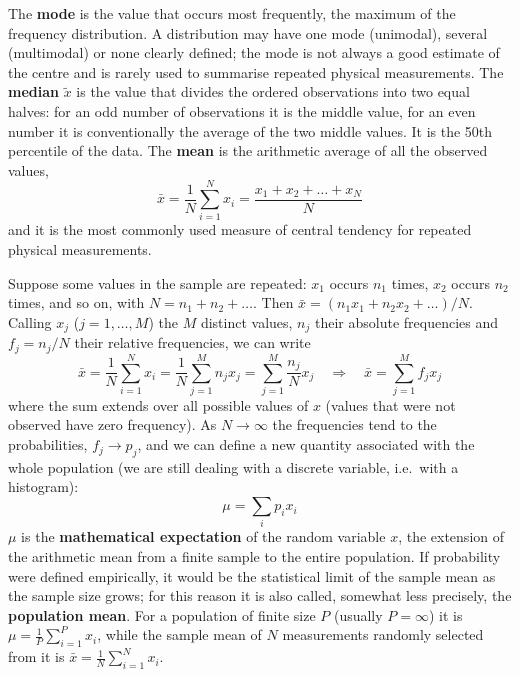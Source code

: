 \documentclass[letterpaper,11pt,leqno]{book}
\begin{document}
The \textbf{mode} is the value that occurs most frequently, the maximum of the frequency distribution. A distribution may have one mode (unimodal), several (multimodal) or none clearly defined; the mode is not always a good estimate of the centre and is rarely used to summarise repeated physical measurements. The \textbf{median} $\tilde{x}$ is the value that divides the ordered observations into two equal halves: for an odd number of observations it is the middle value, for an even number it is conventionally the average of the two middle values. It is the 50th percentile of the data. The \textbf{mean} is the arithmetic average of all the observed values,
\begin{equation}
\boxed{\bar{x} = \frac{1}{N}\sum_{i=1}^{N}x_i = \frac{x_1 + x_2 + \dots + x_N}{N}}
\label{eq:arithmetic_mean}
\end{equation}
and it is the most commonly used measure of central tendency for repeated physical measurements.

Suppose some values in the sample are repeated: $x_1$ occurs $n_1$ times, $x_2$ occurs $n_2$ times, and so on, with $N = n_1 + n_2 + \dots$. Then $\bar{x} = (n_1x_1 + n_2x_2 + \dots)/N$. Calling $x_j$ ($j = 1, \dots, M$) the $M$ distinct values, $n_j$ their absolute frequencies and $f_j = n_j/N$ their relative frequencies, we can write
\begin{equation}
\bar{x} = \frac{1}{N}\sum_{i=1}^{N}x_i = \frac{1}{N}\sum_{j=1}^{M}n_jx_j = \sum_{j=1}^{M}\frac{n_j}{N}x_j \quad \Longrightarrow \quad \boxed{\bar{x} = \sum_{j=1}^{M}f_jx_j}
\label{eq:mean_frequencies}
\end{equation}
where the sum extends over all possible values of $x$ (values that were not observed have zero frequency). As $N \to \infty$ the frequencies tend to the probabilities, $f_j \to p_j$, and we can define a new quantity associated with the whole population (we are still dealing with a discrete variable, i.e.\ with a histogram):
\begin{equation}
\boxed{\mu = \sum_i p_ix_i}
\label{eq:expectation_discrete}
\end{equation}
$\mu$ is the \textbf{mathematical expectation} of the random variable $x$, the extension of the arithmetic mean from a finite sample to the entire population. If probability were defined empirically, it would be the statistical limit of the sample mean as the sample size grows; for this reason it is also called, somewhat less precisely, the \textbf{population mean}. For a population of finite size $P$ (usually $P = \infty$) it is $\mu = \frac{1}{P}\sum_{i=1}^{P}x_i$, while the sample mean of $N$ measurements randomly selected from it is $\bar{x} = \frac{1}{N}\sum_{i=1}^{N}x_i$.
\end{document}
